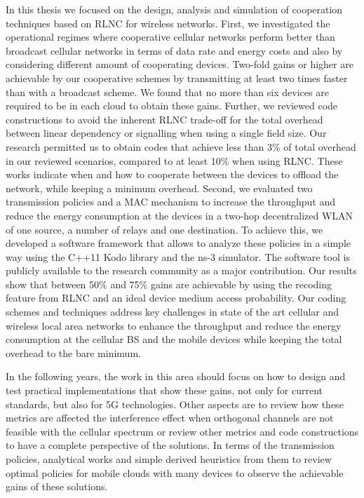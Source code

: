 In this thesis we focused on the design, analysis and simulation of cooperation techniques based on \ac{RLNC} for wireless networks. First, we investigated the operational regimes where cooperative cellular networks perform better than broadcast cellular networks in terms of data rate and energy costs and also by considering different amount of cooperating devices. Two-fold gains or higher are achievable by our cooperative schemes by transmitting at least two times faster than with a broadcast scheme. We found that no more than six devices are required to be in each cloud to obtain these gains. Further, we reviewed code constructions to avoid the inherent \ac{RLNC} trade-off for the total overhead between linear dependency or signalling when using a single field size. Our research permitted us to obtain codes that achieve less than 3\% of total overhead in our reviewed scenarios, compared to at least 10\% when using \ac{RLNC}. These works indicate when and how to cooperate between the devices to offload the network, while keeping a minimum overhead. Second, we evaluated two transmission policies and a \ac{MAC} mechanism to increase the throughput and reduce the energy consumption at the devices in a two-hop decentralized \ac{WLAN} of one source, a number of relays and one destination. To achieve this, we developed a software framework that allows to analyze these policies in a simple way using the C++11 Kodo library and the ns-3 simulator. The software tool is publicly available to the research community as a major contribution. Our results show that between 50\% and 75\% gains are achievable by using the recoding feature from \ac{RLNC} and an ideal device medium access probability. Our coding schemes and techniques address key challenges in state of the art cellular and wireless local area networks to enhance the throughput and reduce the energy consumption at the cellular \ac{BS} and the mobile devices while keeping the total overhead to the bare minimum.

In the following years, the work in this area should focus on how to design and test practical implementations that show these gains, not only for current standards, but also for 5G technologies. Other aspects are to review how these metrics are affected the interference effect when orthogonal channels are not feasible with the cellular spectrum or review other metrics and code constructions to have a complete perspective of the solutions. In terms of the transmission policies, analytical works and simple derived heuristics from them to review optimal policies for mobile clouds with many devices to observe the achievable gains of these solutions.


